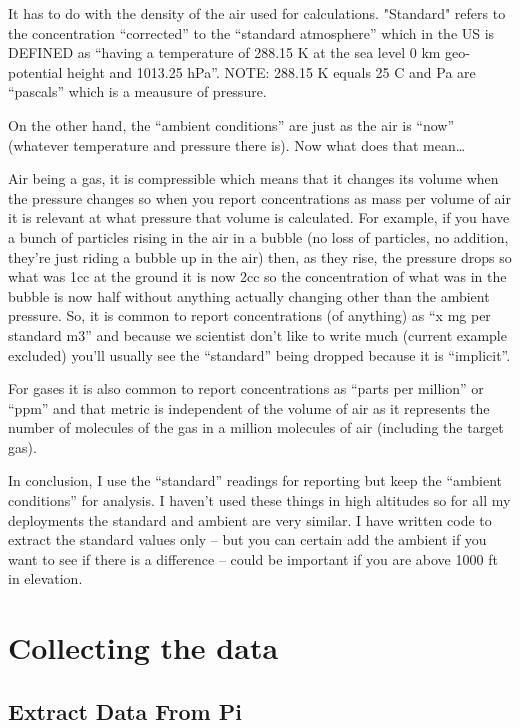 \documentclass{article}\usepackage[]{graphicx}\usepackage[]{xcolor}
\begin{document}
It has to do with the density of the air used for calculations. "Standard" refers to the concentration ``corrected'' to the ``standard atmosphere'' which in the US is DEFINED as ``having a temperature of 288.15 K at the sea level 0 km geo-potential height and 1013.25 hPa''. NOTE: 288.15 K equals 25 C and Pa are ``pascals'' which is a meausure of pressure. 

On the other hand, the ``ambient conditions'' are just as the air is ``now'' (whatever temperature and pressure there is). Now what does that mean\ldots

Air being a gas, it is compressible which means that it changes its volume when the pressure changes so when you report concentrations as mass per volume of air it is relevant at what pressure that volume is calculated. For example, if you have a bunch of particles rising in the air in a bubble (no loss of particles, no addition, they're just riding a bubble up in the air) then, as they rise, the pressure drops so what was 1cc at the ground it is now 2cc so the concentration of what was in the bubble is now half without anything actually changing other than the ambient pressure. So, it is common to report concentrations (of anything) as ``x mg per standard m3'' and because we scientist don't like to write much (current example excluded) you'll usually see the ``standard'' being dropped because it is ``implicit''.

For gases it is also common to report concentrations as ``parts per million'' or ``ppm'' and that metric is independent of the volume of air as it represents the number of molecules of the gas in a million molecules of air (including the target gas).

In conclusion, I use the ``standard'' readings for reporting but keep the ``ambient conditions'' for analysis. I haven't used these things in high altitudes so for all my deployments the standard and ambient are very similar. I have written code to extract the standard values only -- but you can certain add the ambient if you want to see if there is a difference -- could be important if you are above 1000 ft in elevation.

\section{Collecting the data}

\subsection{Extract Data From Pi}
\end{document}
